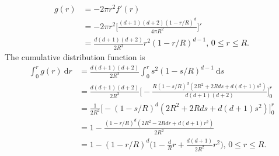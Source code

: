\documentclass[10pt]{article}
\newcommand{\dee}{\mathrm{d}}
\begin{document}
\begin{itemize}
		\begin{align*}
			g(r) 
			&= -2\pi r^2 f'(r)\\
			&= -2\pi r^2
				\bigg[ \frac{(d+1)(d+2)(1 - r/R)^d}{4\pi R^2} \bigg]'\\
			&= \frac{d(d+1)(d+2)}{2R^3} r^2 (1-r/R)^{d-1}\mbox{, $0 \leq r \leq R$}.
		\end{align*}
		The cumulative distribution function is
		\begin{align*}
			\int_0^r g(r)\ \dee r
			&= \frac{d(d+1)(d+2)}{2R^3} \int_0^r s^2(1-s/R)^{d-1}\ \dee s\\
			&= \frac{d(d+1)(d+2)}{2R^3} \bigg[ -\frac{R (1-s/R)^d (2R^2 + 2Rds + d(d+1)s^2) }{d(d+1)(d+2)} \bigg]_0^r\\
			&= \frac{1}{2R^2} 
				\bigg[ -(1-s/R)^d (2R^2 + 2Rds + d(d+1)s^2) \bigg]_0^r\\
			&= 1 - \frac{(1-r/R)^d(2R^2 - 2Rdr + d(d+1)r^2)}{2R^2}\\
			&= 1 - (1-r/R)^d \bigg( 1 - \frac{d}{R}r 
				+ \frac{d(d+1)}{2R^2}r^2 \bigg)\mbox{, $0 \leq r \leq R$}.
		\end{align*}
\end{itemize}
\end{document}
